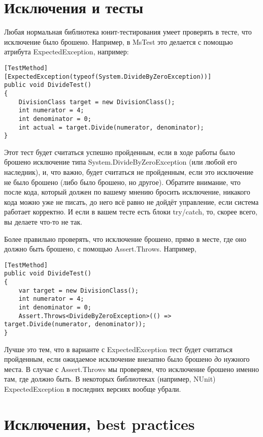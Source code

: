 \documentclass{../../text-style}
\begin{document}
\section{Исключения и тесты}

Любая нормальная библиотека юнит-тестирования умеет проверять в тесте, что исключение было брошено. Например, в MsTest это делается с помощью атрибута ExpectedException, например: 

\begin{verbatim}
[TestMethod]
[ExpectedException(typeof(System.DivideByZeroException))]
public void DivideTest()
{
    DivisionClass target = new DivisionClass();
    int numerator = 4;
    int denominator = 0;
    int actual = target.Divide(numerator, denominator);
}
\end{verbatim}

Этот тест будет считаться успешно пройденным, если в ходе работы было брошено исключение типа System.DivideByZeroException (или любой его наследник), и, что важно, будет считаться не пройденным, если это исключение не было брошено (либо было брошено, но другое). Обратите внимание, что после кода, который должен по вашему мнению бросить исключение, никакого кода можно уже не писать, до него всё равно не дойдёт управление, если система работает корректно. И если в вашем тесте есть блоки try/catch, то, скорее всего, вы делаете что-то не так.

Более правильно проверять, что исключение брошено, прямо в месте, где оно должно быть брошено, с помощью Assert.Throws. Например,

\begin{verbatim}
[TestMethod]
public void DivideTest()
{
    var target = new DivisionClass();
    int numerator = 4;
    int denominator = 0;
    Assert.Throws<DivideByZeroException>(() => target.Divide(numerator, denominator));
}
\end{verbatim}

Лучше это тем, что в варианте с ExpectedException тест будет считаться пройденным, если ожидаемое исключение внезапно было брошено \emph{до} нужного места. В случае с Assert.Throws мы проверяем, что исключение брошено именно там, где должно быть. В некоторых библиотеках (например, NUnit) ExpectedException в последних версиях вообще убрали.

\section{Исключения, best practices}
\end{document}
